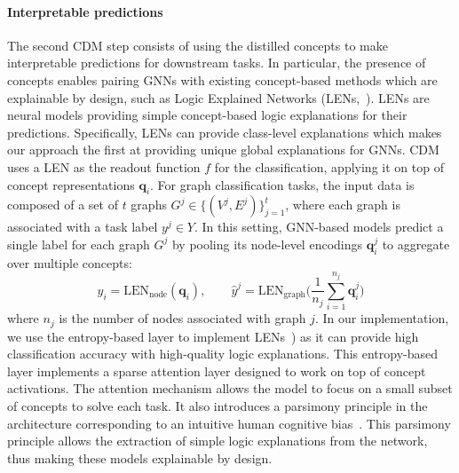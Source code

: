 \documentclass[withindex,glossary]{cam-thesis}
\theoremstyle{plain}
\theoremstyle{definition}
\theoremstyle{remark}
\begin{document}
\paragraph{Interpretable predictions}
The second CDM step consists of using the distilled concepts to make interpretable predictions for downstream tasks. In particular, the presence of concepts enables pairing GNNs with existing concept-based methods which are explainable by design, such as Logic Explained Networks (LENs,~\citep{ciravegna2021logic}). LENs are neural models providing simple concept-based logic explanations for their predictions. Specifically, LENs can provide class-level explanations which makes our approach the first at providing unique global explanations for GNNs. CDM uses a LEN as the readout function $f$ for the classification, applying it on top of concept representations $\mathbf{q}_i$. For graph classification tasks, the input data is composed of a set of $t$ graphs $G^j \in \{(V^j, E^j)\}_{j=1}^t$, where each graph is associated with a task label $y^j \in Y$. In this setting, GNN-based models predict a single label for each graph $G^j$ by pooling its node-level encodings $\mathbf{q}_i^j$ to aggregate over multiple concepts:
\begin{equation} \label{eq:lens}
    \hat{y}_i = \text{LEN}_{\text{node}} ( \mathbf{q}_i), \qquad
    \hat{y}^j = \text{LEN}_{\text{graph}} \Bigg(\frac{1}{n_j} \sum_{i=1}^{n_j} \mathbf{q}_i^j \Bigg)
\end{equation}
where $n_j$ is the number of nodes associated with graph $j$. In our implementation, we use the entropy-based layer to implement LENs~\citep{barbiero2021entropy}) as it can provide high classification accuracy with high-quality logic explanations. This entropy-based layer implements a sparse attention layer designed to work on top of concept activations.
The attention mechanism allows the model to focus on a small subset of concepts to solve each task. It also introduces a parsimony principle in the architecture corresponding to an intuitive human cognitive bias~\citep{miller1956magical}. This parsimony principle allows the extraction of simple logic explanations from the network, thus making these models explainable by design. 
\end{document}
